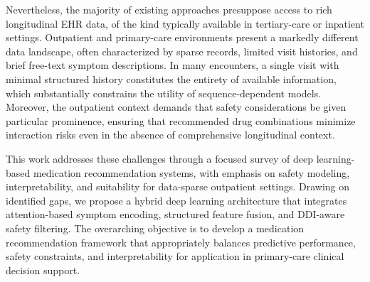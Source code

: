 Nevertheless, the majority of existing approaches presuppose access to rich longitudinal EHR data, of the kind typically available in tertiary-care or inpatient settings. Outpatient and primary-care environments present a markedly different data landscape, often characterized by sparse records, limited visit histories, and brief free-text symptom descriptions. In many encounters, a single visit with minimal structured history constitutes the entirety of available information, which substantially constrains the utility of sequence-dependent models. Moreover, the outpatient context demands that safety considerations be given particular prominence, ensuring that recommended drug combinations minimize interaction risks even in the absence of comprehensive longitudinal context.

This work addresses these challenges through a focused survey of deep learning-based medication recommendation systems, with emphasis on safety modeling, interpretability, and suitability for data-sparse outpatient settings. Drawing on identified gaps, we propose a hybrid deep learning architecture that integrates attention-based symptom encoding, structured feature fusion, and DDI-aware safety filtering. The overarching objective is to develop a medication recommendation framework that appropriately balances predictive performance, safety constraints, and interpretability for application in primary-care clinical decision support.
